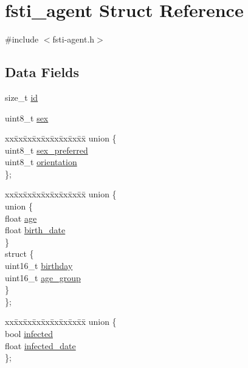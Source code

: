 \hypertarget{structfsti__agent}{}\section{fsti\+\_\+agent Struct Reference}
\label{structfsti__agent}


{\ttfamily \#include $<$fsti-\/agent.\+h$>$}

\subsection*{Data Fields}
\begin{DoxyCompactItemize}
\item 
size\+\_\+t \mbox{\hyperlink{structfsti__agent_a132b33c9ffca7e9e89d2a04045b4b7bb}{id}}
\item 
uint8\+\_\+t \mbox{\hyperlink{structfsti__agent_a81efd8aa28057dcf6fcee094eff29738}{sex}}
\item 
\begin{tabbing}
xx\=xx\=xx\=xx\=xx\=xx\=xx\=xx\=xx\=\kill
union \{\\
\>uint8\_t \mbox{\hyperlink{structfsti__agent_abd0962451cba251baf607ff0e568a2ba}{sex\_preferred}}\\
\>uint8\_t \mbox{\hyperlink{structfsti__agent_a7a235e92690ede9894e55f499f8813e0}{orientation}}\\
\}; \\

\end{tabbing}\item 
\begin{tabbing}
xx\=xx\=xx\=xx\=xx\=xx\=xx\=xx\=xx\=\kill
union \{\\
\>union \{\\
\>\>float \mbox{\hyperlink{structfsti__agent_a44c237039bb02720a770b625f905cf76}{age}}\\
\>\>float \mbox{\hyperlink{structfsti__agent_ac5f2eceb7fd6a171ea7116ed87c9a759}{birth\_date}}\\
\>\} \\
\>struct \{\\
\>\>uint16\_t \mbox{\hyperlink{structfsti__agent_a3643293559e2359cbf0ace373d53e22d}{birthday}}\\
\>\>uint16\_t \mbox{\hyperlink{structfsti__agent_a767fe31626e29a8239d1fb7e6f7dbbdb}{age\_group}}\\
\>\} \\
\}; \\

\end{tabbing}\item 
\begin{tabbing}
xx\=xx\=xx\=xx\=xx\=xx\=xx\=xx\=xx\=\kill
union \{\\
\>bool \mbox{\hyperlink{structfsti__agent_ae726e3b1cb42878ef3ca3148fe597a56}{infected}}\\
\>float \mbox{\hyperlink{structfsti__agent_abd26d368387b3507ca7a1214058eca8e}{infected\_date}}\\
\}; \\


\end{tabbing}
\end{DoxyCompactItemize}
